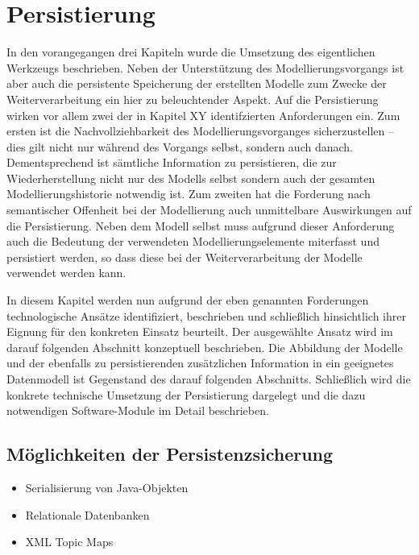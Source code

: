 \chapter{Persistierung} %
\label{cha:persistierung}

In den vorangegangen drei Kapiteln wurde die Umsetzung des eigentlichen Werkzeugs beschrieben. Neben der Unterstützung des Modellierungsvorgangs ist aber auch die persistente Speicherung der erstellten Modelle zum Zwecke der Weiterverarbeitung ein hier zu beleuchtender Aspekt. Auf die Persistierung wirken vor allem zwei der in Kapitel XY identifzierten Anforderungen ein. Zum ersten ist die Nachvollziehbarkeit des Modellierungsvorganges sicherzustellen -- dies gilt nicht nur während des Vorgangs selbst, sondern auch danach. Dementsprechend ist sämtliche Information zu persistieren, die zur Wiederherstellung nicht nur des Modells selbst sondern auch der gesamten Modellierungshistorie notwendig ist. Zum zweiten hat die Forderung nach semantischer Offenheit bei der Modellierung auch unmittelbare Auswirkungen auf die Persistierung. Neben dem Modell selbst muss aufgrund dieser Anforderung auch die Bedeutung der verwendeten Modellierungselemente miterfasst und persistiert werden, so dass diese bei der Weiterverarbeitung der Modelle verwendet werden kann.

In diesem Kapitel werden nun aufgrund der eben genannten Forderungen technologische Ansätze identifiziert, beschrieben und schließlich hinsichtlich ihrer Eignung für den konkreten Einsatz beurteilt. Der ausgewählte Ansatz wird im darauf folgenden Abschnitt konzeptuell beschrieben. Die Abbildung der Modelle und der ebenfalls zu persistierenden zusätzlichen Information in ein geeignetes Datenmodell ist Gegenstand des darauf folgenden Abschnitts. Schließlich wird die konkrete technische Umsetzung der Persistierung dargelegt und die dazu notwendigen Software-Module im Detail beschrieben.
 
\section{Möglichkeiten der Persistenzsicherung} %
\label{sec:möglichkeiten_der_persistenzsicherung}

\begin{itemize}
	\item Serialisierung von Java-Objekten
	\item Relationale Datenbanken
	\item \gls{XML} Topic Maps
\end{itemize}

